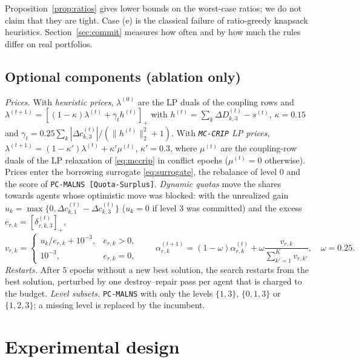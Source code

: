 \documentclass[a4paper,fleqn]{cas-sc}
\newcommand{\pcm}{\texttt{PC-MALNS}}
\newcommand{\mcc}{\texttt{MC-CRIP}}
\newcommand{\pqs}{\texttt{PC-MALNS [Quota-Surplus]}}
\begin{document}
Proposition~\ref{prop:ratios} gives lower bounds on the worst-case ratios; we do not claim that they are tight. Case (e) is the classical failure of ratio-greedy knapsack heuristics. Section~\ref{sec:commit} measures how often and by how much the rules differ on real portfolios.

\subsection{Optional components (ablation only)}
\label{sec:prices}
\textit{Prices.} With \emph{heuristic prices}, $\lambda^{(0)}$ are the LP duals of the coupling rows and $\lambda^{(t+1)} = [(1-\kappa)\lambda^{(t)} + \gamma_t h^{(t)}]_+$ with $h^{(t)} = \sum_k \Delta D_{k,3}^{(t)} - s^{(t)}$, $\kappa = 0.15$ and $\gamma_t = 0.25 \sum_k |\Delta c_{k,3}^{(t)}| / (\|h^{(t)}\|_2^2 + 1)$. With \emph{\mcc{} LP prices}, $\lambda^{(t+1)} = (1-\kappa')\lambda^{(t)} + \kappa' \mu^{(t)}$, $\kappa' = 0.3$, where $\mu^{(t)}$ are the coupling-row duals of the LP relaxation of \eqref{eq:mccrip} in conflict epochs ($\mu^{(t)} = 0$ otherwise). Prices enter the borrowing surrogate \eqref{eq:surrogate}, the rebalance of level $0$ and the score of \pqs.
\textit{Dynamic quotas} move the shares towards agents whose optimistic move was blocked: with the unrealized gain $u_k = \max\{0, \Delta c_{k,1}^{(t)} - \Delta c_{k,3}^{(t)}\}$ ($u_k = 0$ if level $3$ was committed) and the excess $e_{r,k} = [\delta_{r,k,3}^{(t)}]_+$,
\begin{equation}
    v_{r,k} = \begin{cases} u_k / e_{r,k} + 10^{-3}, & e_{r,k} > 0, \\ 10^{-3}, & e_{r,k} = 0, \end{cases} \qquad \alpha_{r,k}^{(t+1)} = (1-\omega)\alpha_{r,k}^{(t)} + \omega \frac{v_{r,k}}{\sum_{k'=1}^K v_{r,k'}}, \quad \omega = 0.25. \label{eq:quota_update}
\end{equation}
\textit{Restarts.} After $5$ epochs without a new best solution, the search restarts from the best solution, perturbed by one destroy--repair pass per agent that is charged to the budget. \textit{Level subsets.} \pcm{} with only the levels $\{1,3\}$, $\{0,1,3\}$ or $\{1,2,3\}$; a missing level is replaced by the incumbent.

\section{Experimental design}
\label{sec:design}
\end{document}
